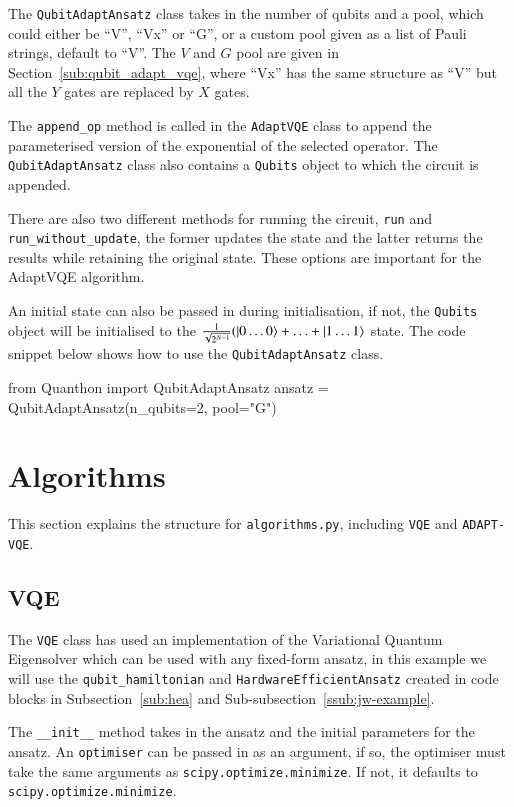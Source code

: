 The \texttt{QubitAdaptAnsatz} class takes in the number of qubits and a pool, which could either be ``V'', ``Vx'' or ``G'', or a custom pool given as a list of Pauli strings, default to ``V''. The $V$ and $G$ pool are given in Section~\ref{sub:qubit_adapt_vqe}, where ``Vx'' has the same structure as ``V'' but all the $ Y $ gates are replaced by $ X $ gates. 

The \texttt{append\_op} method is called in the \texttt{AdaptVQE} class to append the parameterised version of the exponential of the selected operator. The \texttt{QubitAdaptAnsatz} class also contains a \texttt{Qubits} object to which the circuit is appended. 

There are also two different methods for running the circuit, \texttt{run} and \texttt{run\_without\_update}, the former updates the state and the latter returns the results while retaining the original state. These options are important for the AdaptVQE algorithm.

An initial state can also be passed in during initialisation, if not, the \texttt{Qubits} object will be initialised to the $ \frac{1}{\sqrt{2^{N-1}}} (\ket{0\ldots 0} + \ldots + \ket{1\ldots 1}  $ state. The code snippet below shows how to use the \texttt{QubitAdaptAnsatz} class.
\begin{mycode}
	from Quanthon import QubitAdaptAnsatz
	ansatz = QubitAdaptAnsatz(n_qubits=2, pool="G")
\end{mycode}
\section{Algorithms}
\label{sec:algo}
This section explains the structure for \texttt{algorithms.py}, including \texttt{VQE} and \texttt{ADAPT-VQE}. 

\subsection{VQE}
\label{sub:algo-vqe}
The \texttt{VQE} class has used an implementation of the Variational Quantum Eigensolver which can be used with any fixed-form ansatz,  in this example we will use the \texttt{qubit\_hamiltonian} and \texttt{HardwareEfficientAnsatz} created in code blocks in Subsection~\ref{sub:hea} and Sub-subsection~\ref{ssub:jw-example}.

The \texttt{\_\_init\_\_} method takes in the ansatz and the initial parameters for the ansatz. An \texttt{optimiser} can be passed in as an argument, if so, the optimiser must take the same arguments as \texttt{scipy.optimize.minimize}. If not, it defaults to \texttt{scipy.optimize.minimize}. 

